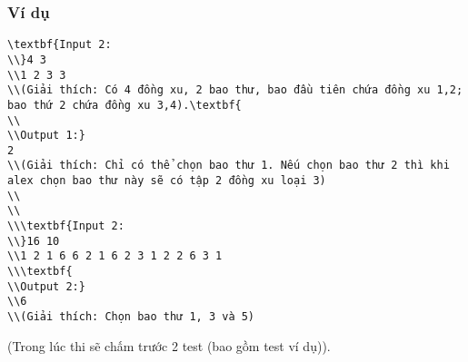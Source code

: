 \subsubsection{   Ví dụ  }
\begin{verbatim}
\textbf{Input 2:
\\}4 3
\\1 2 3 3
\\(Giải thích: Có 4 đồng xu, 2 bao thư, bao đầu tiên chứa đồng xu 1,2; bao thứ 2 chứa đồng xu 3,4).\textbf{
\\
\\Output 1:}
2
\\(Giải thích: Chỉ có thể chọn bao thư 1. Nếu chọn bao thư 2 thì khi alex chọn bao thư này sẽ có tập 2 đồng xu loại 3)
\\
\\
\\\textbf{Input 2:
\\}16 10
\\1 2 1 6 6 2 1 6 2 3 1 2 2 6 3 1
\\\textbf{
\\Output 2:}
\\6
\\(Giải thích: Chọn bao thư 1, 3 và 5)\end{verbatim}

(Trong lúc thi sẽ chấm trước 2 test (bao gồm test ví dụ)).

